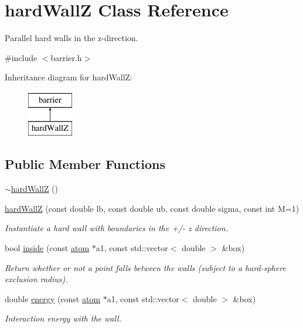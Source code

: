 \hypertarget{classhard_wall_z}{\section{hard\-Wall\-Z Class Reference}
\label{classhard_wall_z}
}


Parallel hard walls in the z-\/direction.  




{\ttfamily \#include $<$barrier.\-h$>$}

Inheritance diagram for hard\-Wall\-Z\-:\begin{figure}[H]
\begin{center}
\leavevmode
\includegraphics[height=2.000000cm]{classhard_wall_z}
\end{center}
\end{figure}
\subsection*{Public Member Functions}
\begin{DoxyCompactItemize}
\item 
\hyperlink{classhard_wall_z_a65910c4aca42a07e7ca0a12dbe25b895}{$\sim$hard\-Wall\-Z} ()
\item 
\hyperlink{classhard_wall_z_a0c04f7e529316bb89187a74ff3316f48}{hard\-Wall\-Z} (const double lb, const double ub, const double sigma, const int M=1)
\begin{DoxyCompactList}\small\item\em Instantiate a hard wall with boundaries in the +/-\/ z direction. \end{DoxyCompactList}\item 
bool \hyperlink{classhard_wall_z_ac4c72aa32e0cdfe40c6765642ffb78d7}{inside} (const \hyperlink{classatom}{atom} $\ast$a1, const std\-::vector$<$ double $>$ \&box)
\begin{DoxyCompactList}\small\item\em Return whether or not a point falls between the walls (subject to a hard-\/sphere exclusion radius). \end{DoxyCompactList}\item 
double \hyperlink{classhard_wall_z_ae1c05d46be694e7b071969f9511e4142}{energy} (const \hyperlink{classatom}{atom} $\ast$a1, const std\-::vector$<$ double $>$ \&box)
\begin{DoxyCompactList}\small\item\em Interaction energy with the wall. \end{DoxyCompactList}\end{DoxyCompactItemize}
